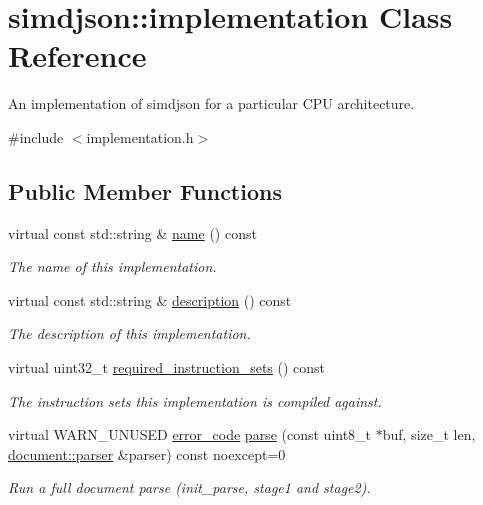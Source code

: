 \hypertarget{classsimdjson_1_1implementation}{}\section{simdjson\+:\+:implementation Class Reference}
\label{classsimdjson_1_1implementation}


An implementation of simdjson for a particular C\+PU architecture.  




{\ttfamily \#include $<$implementation.\+h$>$}

\subsection*{Public Member Functions}
\begin{DoxyCompactItemize}
\item 
virtual const std\+::string \& \hyperlink{classsimdjson_1_1implementation_a404c32ec6187ac0fb5b2ec6b5aea4abd}{name} () const
\begin{DoxyCompactList}\small\item\em The name of this implementation. \end{DoxyCompactList}\item 
virtual const std\+::string \& \hyperlink{classsimdjson_1_1implementation_a4f41daefefc573e20fccd591b158e063}{description} () const
\begin{DoxyCompactList}\small\item\em The description of this implementation. \end{DoxyCompactList}\item 
virtual uint32\+\_\+t \hyperlink{classsimdjson_1_1implementation_a64a43c16f8dfcec3c20c05c17b43b753}{required\+\_\+instruction\+\_\+sets} () const
\begin{DoxyCompactList}\small\item\em The instruction sets this implementation is compiled against. \end{DoxyCompactList}\item 
virtual W\+A\+R\+N\+\_\+\+U\+N\+U\+S\+ED \hyperlink{namespacesimdjson_a7b735a3a50ba79e3f7f14df5f77d8da9}{error\+\_\+code} \hyperlink{classsimdjson_1_1implementation_ab91b208c5104e565702cfeb9797533bf}{parse} (const uint8\+\_\+t $\ast$buf, size\+\_\+t len, \hyperlink{classsimdjson_1_1document_1_1parser}{document\+::parser} \&parser) const noexcept=0
\begin{DoxyCompactList}\small\item\em Run a full document parse (init\+\_\+parse, stage1 and stage2). \end{DoxyCompactList}\item 

\end{DoxyCompactItemize}
